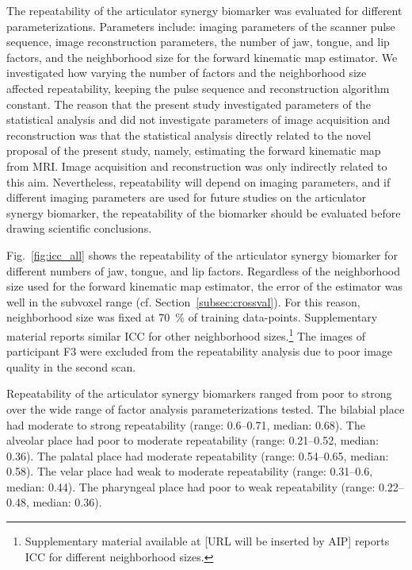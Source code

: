 \documentclass[reprint]{JASAnew}\usepackage[]{graphicx}\usepackage[]{color}
\begin{document}
The repeatability of the articulator synergy biomarker was evaluated for different parameterizations. 
%
Parameters include: imaging parameters of the scanner pulse sequence, image reconstruction parameters, the number of jaw, tongue, and lip factors, and the neighborhood size for the forward kinematic map estimator.
%
We investigated how varying the number of factors and the neighborhood size affected repeatability, keeping the pulse sequence and reconstruction algorithm constant. 
%
The reason that the present study investigated parameters of the statistical analysis and did not investigate parameters of image acquisition and reconstruction was that the statistical analysis directly related to the novel proposal of the present study, namely, estimating the forward kinematic map from MRI. Image acquisition and reconstruction was only indirectly related to this aim. 
%
Nevertheless, repeatability will depend on imaging parameters, and if different imaging parameters are used for future studies on the articulator synergy biomarker, the repeatability of the biomarker should be evaluated before drawing scientific conclusions. 

Fig.~\ref{fig:icc_all} shows the repeatability of the articulator synergy biomarker for different numbers of jaw, tongue, and lip factors. 
%
Regardless of the neighborhood size used for the forward kinematic map estimator, the error of the estimator was well in the subvoxel range (cf. Section~\ref{subsec:crossval}). For this reason, neighborhood size was fixed at \SI{70}{\percent} of training data-points. Supplementary material reports similar ICC for other neighborhood sizes.\footnote{Supplementary material available at [URL will be inserted by AIP] reports ICC for different neighborhood sizes.}
%
The images of participant F3 were excluded from the repeatability analysis due to poor image quality in the second scan. 



Repeatability of the articulator synergy biomarkers ranged from poor to strong over the wide range of factor analysis parameterizations tested. 
%
%
The bilabial place had
moderate  to  strong
repeatability
(range: \numrange{0.6}{0.71},
median: \num{0.68}). 
%
% 
The alveolar place had
poor  to  moderate
repeatability
(range: \numrange{0.21}{0.52},
median: \num{0.36}). 
%
%
The palatal place had
moderate
repeatability
(range: \numrange{0.54}{0.65},
median: \num{0.58}). 
%
%
The velar place had
weak  to  moderate
repeatability
(range: \numrange{0.31}{0.6},
median: \num{0.44}). 
%
%
The pharyngeal place had 
poor  to  weak
repeatability
(range: \numrange{0.22}{0.48},
median: \num{0.36}). 
\end{document}
